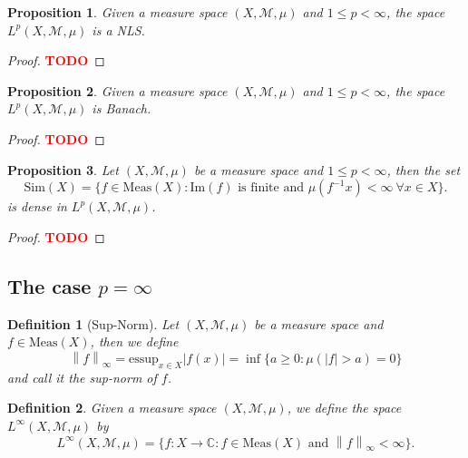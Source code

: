 \documentclass{article}
\newtheorem*{proposition}{Proposition}
\newtheorem*{definition}{Definition}
\newcommand{\C}{\mathbb{C}}
\newcommand{\M}{\mathcal{M}}
\newcommand{\lnorm}[2]{\left\lVert#2 \right\rVert_{#1}}
\renewcommand{\Im}{\text{Im}}
\newcommand{\td}{\textcolor{red}{\textbf{TODO}}}
\begin{document}
\begin{proposition}
    Given a measure space $(X, \M, \mu)$ and $1 \leq p < \infty$, the space $L^p(X, \M, \mu)$ is a NLS.
\end{proposition}

\begin{proof}
    \td 
\end{proof}

\begin{proposition}
    Given a measure space $(X, \M, \mu)$ and $1 \leq p < \infty$, the space $L^p(X, \M, \mu)$ is Banach.
\end{proposition}

\begin{proof}
    \td 
\end{proof}

\begin{proposition}
    Let $(X, \M, \mu)$ be a measure space and $1 \leq p < \infty$, then the set
    $$\text{Sim}(X) = \{f \in \text{Meas}(X) : \Im(f) \text{ is finite and } \mu(f^{-1}x) < \infty \ \forall x \in X\}.$$
    is dense in $L^p(X, \M, \mu)$.
\end{proposition}

\begin{proof}
    \td 
\end{proof}

\subsection{The case $p = \infty$}

\begin{definition}[Sup-Norm]
    Let $(X, \M, \mu)$ be a measure space and $f \in \text{Meas}(X)$, then we define 
    $$\lnorm{\infty}{f} = \text{essup}_{x \in X}|f(x)| = \inf \{a \geq 0 : \mu(|f|>a) = 0\}$$
    and call it the sup-norm of $f$.
\end{definition}

\begin{definition}
    Given a measure space $(X, \M, \mu)$, we define the space $L^{\infty}(X, \M, \mu)$ by
    $$L^{\infty}(X, \M, \mu) = \{f : X \to \C : f\in \text{Meas}(X) \text{ and } \lnorm{\infty}{f} < \infty\}.$$
\end{definition}
\end{document}
